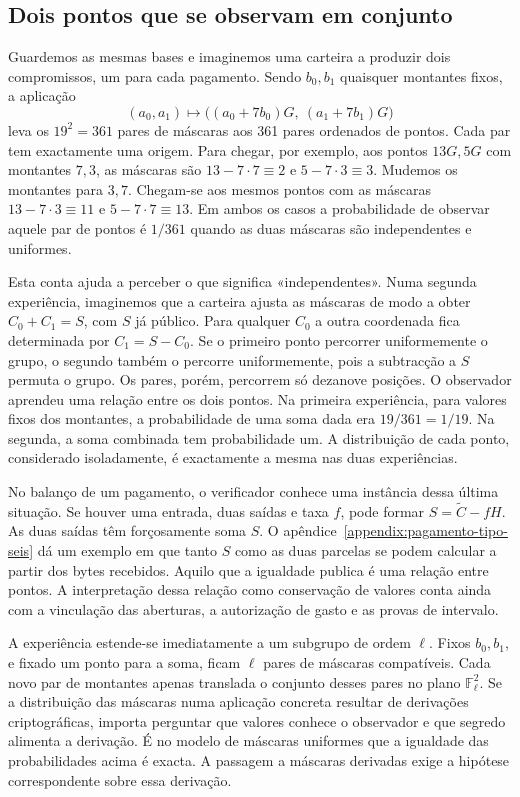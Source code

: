 \subsection{Dois pontos que se observam em conjunto}

Guardemos as mesmas bases e imaginemos uma carteira a produzir dois
compromissos, um para cada pagamento. Sendo \(b_0,b_1\) quaisquer
montantes fixos, a aplicação
\[
   (a_0,a_1)\longmapsto
     \bigl((a_0+7b_0)G,\ (a_1+7b_1)G\bigr)
\]
leva os \(19^2=361\) pares de máscaras aos 361 pares ordenados de
pontos. Cada par tem exactamente uma origem. Para chegar, por
exemplo, aos pontos \(13G,5G\) com montantes \(7,3\), as máscaras
são \(13-7\cdot7\equiv2\) e \(5-7\cdot3\equiv3\). Mudemos os
montantes para \(3,7\). Chegam-se aos mesmos pontos com as máscaras
\(13-7\cdot3\equiv11\) e \(5-7\cdot7\equiv13\). Em ambos os
casos a probabilidade de observar aquele par de pontos é \(1/361\)
quando as duas máscaras são independentes e uniformes.

Esta conta ajuda a perceber o que significa «independentes». Numa
segunda experiência, imaginemos que a carteira ajusta as máscaras
de modo a obter \(C_0+C_1=S\), com \(S\) já público. Para qualquer
\(C_0\) a outra coordenada fica determinada por \(C_1=S-C_0\).
Se o primeiro ponto percorrer uniformemente o grupo, o segundo
também o percorre uniformemente, pois a subtracção a \(S\) permuta
o grupo. Os pares, porém, percorrem só dezanove posições. O
observador aprendeu uma relação entre os dois pontos. Na primeira
experiência, para valores fixos dos montantes, a probabilidade de uma
soma dada era \(19/361=1/19\). Na segunda, a soma combinada tem
probabilidade um. A distribuição de cada ponto, considerado
isoladamente, é exactamente a mesma nas duas experiências.

No balanço de um pagamento, o verificador conhece uma instância
dessa última situação. Se houver uma entrada, duas saídas e taxa
\(f\), pode formar \(S=\widetilde C-fH\). As duas saídas têm
forçosamente soma \(S\). O apêndice~\ref{appendix:pagamento-tipo-seis}
dá um exemplo em que tanto \(S\) como as duas parcelas se podem
calcular a partir dos bytes recebidos. Aquilo que a igualdade
publica é uma relação entre pontos. A interpretação dessa relação
como conservação de valores conta ainda com a vinculação das
aberturas, a autorização de gasto e as provas de intervalo.

A experiência estende-se imediatamente a um subgrupo de ordem
\(\ell\). Fixos \(b_0,b_1\), e fixado um ponto para a soma, ficam
\(\ell\) pares de máscaras compatíveis. Cada novo par de montantes
apenas translada o conjunto desses pares no plano
\(\mathbb F_\ell^2\). Se a distribuição das máscaras numa aplicação
concreta resultar de derivações criptográficas, importa perguntar
que valores conhece o observador e que segredo alimenta a derivação.
É no modelo de máscaras uniformes que a igualdade das probabilidades
acima é exacta. A passagem a máscaras derivadas exige a hipótese
correspondente sobre essa derivação.
